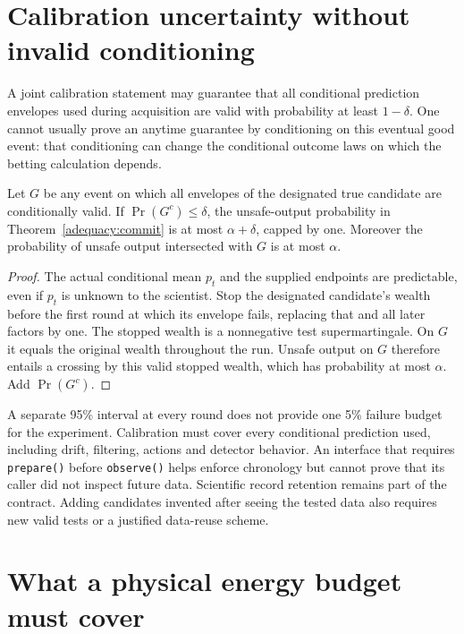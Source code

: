 \section{Calibration uncertainty without invalid conditioning}

A joint calibration statement may guarantee that all conditional prediction
envelopes used during acquisition are valid with probability at least
$1-\delta$. One cannot usually prove an anytime guarantee by conditioning on
this eventual good event: that conditioning can change the conditional outcome
laws on which the betting calculation depends.

\begin{proposition}
\label{adequacy:calibration}
Let $G$ be any event on which all envelopes of the designated true candidate
are conditionally valid. If $\Pr(G^c)\leq\delta$, the unsafe-output probability
in Theorem~\ref{adequacy:commit} is at most $\alpha+\delta$, capped by one.
Moreover the probability of unsafe output intersected with $G$ is at most
$\alpha$.
\end{proposition}
\begin{proof}
The actual conditional mean $p_t$ and the supplied endpoints are predictable,
even if $p_t$ is unknown to the scientist. Stop the designated candidate's
wealth before the first round at which its envelope fails, replacing that and
all later factors by one. The stopped wealth is a nonnegative test
supermartingale. On $G$ it equals the original wealth throughout the run.
Unsafe output on $G$ therefore entails a crossing by this valid stopped wealth,
which has probability at most $\alpha$. Add $\Pr(G^c)$.
\end{proof}

A separate 95\% interval at every round does not provide one 5\% failure budget
for the experiment. Calibration must cover every conditional prediction used,
including drift, filtering, actions and detector behavior. An interface that
requires \texttt{prepare()} before \texttt{observe()} helps enforce chronology
but cannot prove that its caller did not inspect future data. Scientific record
retention remains part of the contract. Adding candidates invented after seeing
the tested data also requires new valid tests or a justified data-reuse scheme.

\section{What a physical energy budget must cover}

